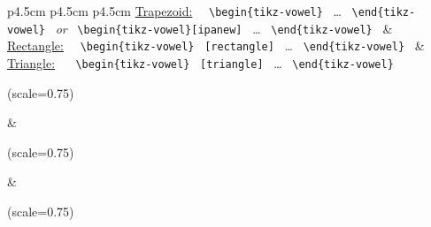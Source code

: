 \documentclass{article}
\def\\{}%
\def\newline{~}%
\begin{document}
\begin{center}
\begin{tabular}{p{4.5cm} p{4.5cm} p{4.5cm}}
  {\small
	\underline{Trapezoid:}\newline\newline
    \verb|\begin{tikz-vowel}|\newline
    	\hspace*{3em}\dots\newline
    \verb|\end{tikz-vowel}|\newline
    \emph{or}\newline
    \verb|\begin{tikz-vowel}[ipanew]|\newline
    	\hspace*{3em}\dots\newline
    \verb|\end{tikz-vowel}|\newline
    }
  &
  {\small
  	\underline{Rectangle:}\newline\newline
    \verb|\begin{tikz-vowel}|\newline
    	\hspace*{\fill}\verb|[rectangle]|\newline
    	\hspace*{3em}\dots\newline
    \verb|\end{tikz-vowel}|\newline
    }
  &
  {\small
  	\underline{Triangle:} \newline\newline
    \verb|\begin{tikz-vowel}|\newline
    	\hspace*{\fill}\verb|[triangle]|\newline
    	\hspace*{3em}\dots\newline
    \verb|\end{tikz-vowel}|\newline
    }\\

	\begin{tikz-vowel}(scale=0.75)\end{tikz-vowel} & 
	\begin{tikz-vowel}[rectangle](scale=0.75)\end{tikz-vowel} & 
	\begin{tikz-vowel}[triangle](scale=0.75)\end{tikz-vowel}

\end{tabular}
\end{center}
\end{document}
